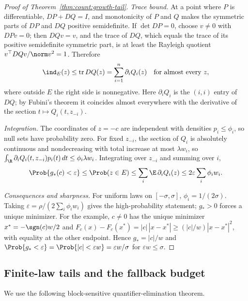 \begin{proof}[Proof of Theorem~\ref{thm:count:growth-tail}]
\emph{Trace bound.} At a point where $P$ is differentiable,
$DP+DQ=I$, and monotonicity of $P$ and $Q$ makes the symmetric parts of $DP$
and $DQ$ positive semidefinite. If $\det DP=0$, choose $v\ne0$ with $DPv=0$;
then $DQv=v$, and the trace of $DQ$, which equals the trace of its positive
semidefinite symmetric part, is at least the Rayleigh quotient
$v^\top DQv/\norm v^2=1$. Therefore
\[
 \ind_E(z)\le\operatorname{tr}DQ(z)=\sum_{i=1}^n\partial_iQ_i(z)
 \quad\text{for almost every }z,
\]
where outside $E$ the right side is nonnegative. Here $\partial_iQ_i$ is the
$(i,i)$ entry of $DQ$; by Fubini's theorem it coincides almost everywhere with
the derivative of the section $t\mapsto Q_i(t,z_{-i})$.

\emph{Integration.} The coordinates of $z=-c$ are independent with densities
$p_i\le\phi_i$, so null sets have probability zero. For fixed $z_{-i}$, the
section of $Q_i$ is absolutely continuous and nondecreasing with total
increase at most $\lambda w_i$, so
$\int_\R\partial_iQ_i(t,z_{-i})p_i(t)\,dt\le\phi_i\lambda w_i$. Integrating
over $z_{-i}$ and summing over $i$,
\[
 \Prob\{g_*(c)<\varepsilon\}\le\Prob(z\in E)\le\sum_i\E\,\partial_iQ_i(z)
 \le2\varepsilon\sum_i\phi_iw_i .
\]

\emph{Consequences and sharpness.} For uniform laws on $[-\sigma,\sigma]$,
$\phi_i=1/(2\sigma)$. Taking $\varepsilon=\rho/(2\sum_i\phi_iw_i)$ gives the
high-probability statement; $g_*>0$ forces a unique minimizer. For the
example, $c\ne0$ has the unique minimizer $x^*=-\sgn(c)w/2$ and
$F_c(x)-F_c(x^*)=|c|\,|x-x^*|\ge(|c|/w)|x-x^*|^2$, with equality at the other
endpoint. Hence $g_*=|c|/w$ and
$\Prob\{g_*<\varepsilon\}=\Prob\{|c|<\varepsilon w\}=\varepsilon w/\sigma$
for $\varepsilon w\le\sigma$.
\end{proof}

\subsection{Finite-law tails and the fallback budget}

We use the following block-sensitive quantifier-elimination theorem.

